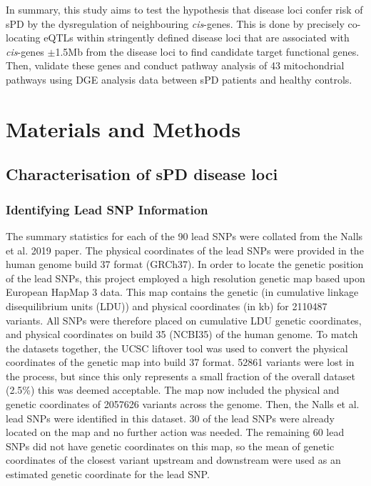 \documentclass{article}
\begin{document}
In summary, this study aims to test the hypothesis that disease loci confer risk of sPD by the dysregulation of neighbouring \textit{cis}-genes. This is done by precisely co-locating eQTLs within stringently defined disease loci that are associated with \textit{cis}-genes $\pm$1.5Mb from the disease loci to find candidate target functional genes. Then, validate these genes and conduct pathway analysis of 43 mitochondrial pathways using DGE analysis data between sPD patients and healthy controls.
\newpage
\section{Materials and Methods}
\subsection{Characterisation of sPD disease loci}
\subsubsection{Identifying Lead SNP Information}
\label{subsubsec:SNPs}
The summary statistics for each of the 90 lead SNPs were collated from the Nalls et al. 2019 paper\cite{Nalls2019IdentificationStudies}. The physical coordinates of the lead SNPs were provided in the human genome build 37 format (GRCh37). In order to locate the genetic position of the lead SNPs, this project employed a high resolution genetic map\cite{Maniatis2004PositionalDisequilibrium.} based upon European HapMap 3 data. This map contains the genetic (in cumulative linkage disequilibrium units (LDU)) and physical coordinates (in kb) for 2110487 variants. All SNPs were therefore placed on cumulative LDU genetic coordinates, and physical coordinates on build 35 (NCBI35) of the human genome. To match the datasets together, the UCSC liftover tool\cite{Hinrichs2006The2006.} was used to convert the physical coordinates of the genetic map into build 37 format. 52861 variants were lost in the process, but since this only represents a small fraction of the overall dataset (2.5\%) this was deemed acceptable. The map now included the physical and genetic coordinates of 2057626 variants across the genome. Then, the Nalls et al.\cite{Nalls2019IdentificationStudies} lead SNPs were identified in this dataset. 30 of the lead SNPs were already located on the map and no further action was needed. The remaining 60 lead SNPs did not have genetic coordinates on this map, so the mean of genetic coordinates of the closest variant upstream and downstream were used as an estimated genetic coordinate for the lead SNP.
\end{document}
